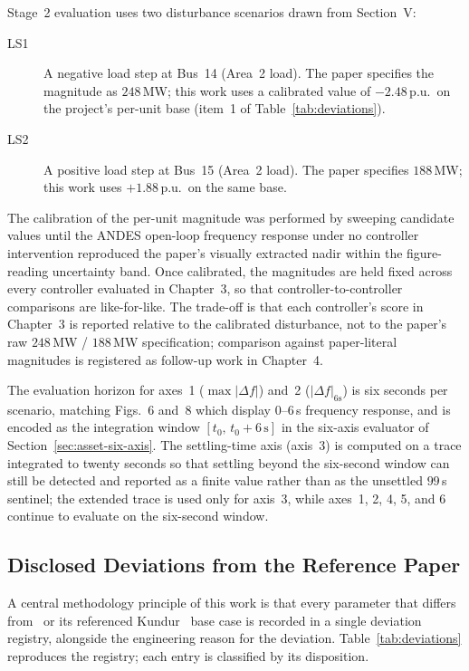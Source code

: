 \documentclass{unnc-fyp}
\begin{document}
Stage~2 evaluation uses two disturbance scenarios drawn from
\cite{yang2023ddic} Section~V:

\begin{description}
  \item[LS1] A negative load step at Bus~14 (Area~2 load).
             The paper specifies the magnitude as $248$\,MW;
             this work uses a calibrated value of $-2.48$\,p.u.\
             on the project's per-unit base
             (item~1 of Table~\ref{tab:deviations}).
  \item[LS2] A positive load step at Bus~15 (Area~2 load).
             The paper specifies $188$\,MW; this work uses
             $+1.88$\,p.u.\ on the same base.
\end{description}

The calibration of the per-unit magnitude was performed by
sweeping candidate values until the ANDES open-loop frequency
response under no controller intervention reproduced the paper's
visually extracted nadir within the figure-reading uncertainty
band.
Once calibrated, the magnitudes are held fixed across every
controller evaluated in Chapter~3, so that
controller-to-controller comparisons are like-for-like.
The trade-off is that each controller's score in Chapter~3 is
reported relative to the calibrated disturbance, not to the
paper's raw $248$\,MW / $188$\,MW specification;
comparison against paper-literal magnitudes is registered as
follow-up work in Chapter~4.

The evaluation horizon for axes~1 ($\max|\Delta f|$) and~2
($|\Delta f|_{6\mathrm{s}}$) is six seconds per scenario, matching
\cite{yang2023ddic} Figs.~6 and~8 which display $0$--$6$\,s
frequency response, and is encoded as the integration window
$[t_0,\, t_0 + 6\,\mathrm{s}]$ in the six-axis evaluator of
Section~\ref{sec:asset-six-axis}.
The settling-time axis (axis~3) is computed on a trace integrated
to twenty seconds so that settling beyond the six-second window can
still be detected and reported as a finite value rather than as
the unsettled $99$\,s sentinel; the extended trace is used only
for axis~3, while axes~1, 2, 4, 5, and 6 continue to evaluate on
the six-second window.

\subsection{Disclosed Deviations from the Reference Paper}
\label{sec:deviation-registry}

A central methodology principle of this work is that every
parameter that differs from~\cite{yang2023ddic} or its referenced
Kundur~\cite{kundur1994power} base case is recorded in a single
deviation registry, alongside the engineering reason for the
deviation.
Table~\ref{tab:deviations} reproduces the registry; each entry is
classified by its disposition.
\end{document}
